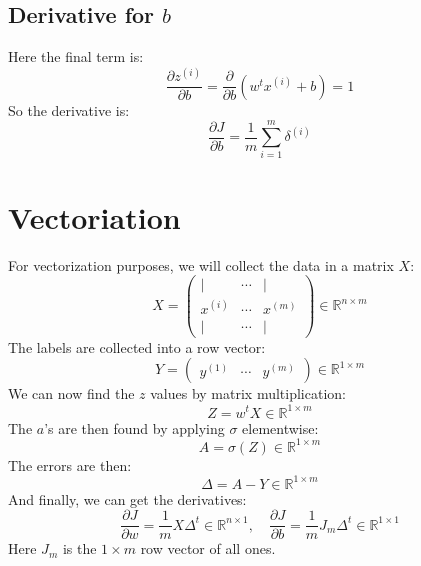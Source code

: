 \documentclass[12pt, a4paper]{article}
\numberwithin{equation}{section}
\begin{document}
\subsection{Derivative for $b$}
Here the final term is:
\begin{equation}
\frac{\partial z^{(i)}}{\partial b}=\frac{\partial}{\partial b}\left(w^t x^{(i)}+b\right)=1
\end{equation}
So the derivative is:
\begin{equation}
\frac{\partial J}{\partial b}=\frac{1}{m}\sum_{i=1}^m\delta^{(i)}
\end{equation}

\section{Vectoriation}
For vectorization purposes, we will collect the data in a matrix $X$:
\begin{equation}
X=\begin{pmatrix}
| & \cdots & | \\
x^{(i)} & \cdots & x^{(m)} \\
| & \cdots & |
\end{pmatrix}
\in\mathbb{R}^{n\times m}
\end{equation}
The labels are collected into a row vector:
\begin{equation}
Y=\begin{pmatrix}
y^{(1)} & \cdots & y^{(m)}
\end{pmatrix}
\in\mathbb{R}^{1\times m}
\end{equation}
We can now find the $z$ values by matrix multiplication:
\begin{equation}
Z=w^t X\in\mathbb{R}^{1\times m}
\end{equation}
The $a$'s are then found by applying $\sigma$ elementwise:
\begin{equation}
A=\sigma(Z)\in\mathbb{R}^{1\times m}
\end{equation}
The errors are then:
\begin{equation}
\Delta=A-Y\in\mathbb{R}^{1\times m}
\end{equation}
And finally, we can get the derivatives:
\begin{equation}
\frac{\partial J}{\partial w}=\frac{1}{m}X\Delta^t\in\mathbb{R}^{n\times 1},\quad
\frac{\partial J}{\partial b}=\frac{1}{m}J_m\Delta^t\in\mathbb{R}^{1\times 1}
\end{equation}
Here $J_m$ is the $1\times m$ row vector of all ones.
\end{document}
